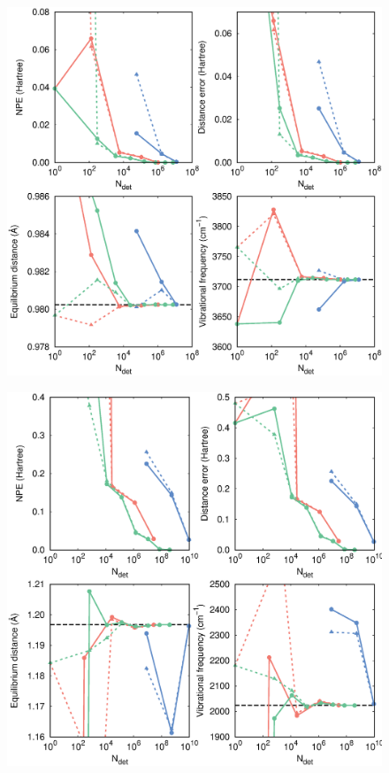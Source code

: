 \documentclass[aip,jcp,preprint,noshowkeys,superscriptaddress]{revtex4-1}
\begin{document}
\begin{figure}%
\includegraphics[width=1.0\linewidth]{plot_pt2_rpt2_OH}
\caption{
}
\label{fig:plot_pt2_rpt2_oh}
\end{figure}

\begin{figure}%
\includegraphics[width=1.0\linewidth]{plot_pt2_rpt2_CN}
\caption{
}
\label{fig:plot_pt2_rpt2_cn}
\end{figure}
\end{document}
